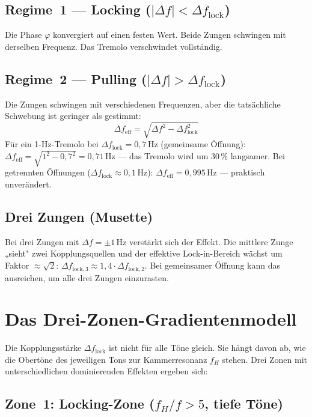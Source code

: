 \documentclass[11pt,a4paper]{article}
\begin{document}
\subsection{Regime~1 --- Locking ($|\Delta f| < \Delta f_\text{lock}$)}
Die Phase $\varphi$ konvergiert auf einen festen Wert. Beide Zungen schwingen mit derselben Frequenz. Das Tremolo verschwindet vollständig.

\subsection{Regime~2 --- Pulling ($|\Delta f| > \Delta f_\text{lock}$)}
Die Zungen schwingen mit verschiedenen Frequenzen, aber die tatsächliche Schwebung ist geringer als gestimmt:
\begin{equation}
\Delta f_\text{eff} = \sqrt{\Delta f^2 - \Delta f_\text{lock}^2}
\end{equation}
Für ein 1-Hz-Tremolo bei $\Delta f_\text{lock} = 0{,}7$\,Hz (gemeinsame Öffnung): $\Delta f_\text{eff} = \sqrt{1^2 - 0{,}7^2} = 0{,}71$\,Hz --- das Tremolo wird um 30\,\% langsamer. Bei getrennten Öffnungen ($\Delta f_\text{lock} \approx 0{,}1$\,Hz): $\Delta f_\text{eff} = 0{,}995$\,Hz --- praktisch unverändert.

\subsection{Drei Zungen (Musette)}

Bei drei Zungen mit $\Delta f = \pm 1$\,Hz verstärkt sich der Effekt. Die mittlere Zunge „sieht" zwei Kopplungsquellen und der effektive Lock-in-Bereich wächst um Faktor $\approx \sqrt{2}$: $\Delta f_{\text{lock},3} \approx 1{,}4 \cdot \Delta f_{\text{lock},2}$. Bei gemeinsamer Öffnung kann das ausreichen, um alle drei Zungen einzurasten.

\section{Das Drei-Zonen-Gradientenmodell}

Die Kopplungsstärke $\Delta f_\text{lock}$ ist nicht für alle Töne gleich. Sie hängt davon ab, wie die Obertöne des jeweiligen Tons zur Kammerresonanz $f_H$ stehen. Drei Zonen mit unterschiedlichen dominierenden Effekten ergeben sich:

\subsection{\textcolor{zone1blue}{Zone~1: Locking-Zone ($f_H/f > 5$, tiefe Töne)}}
\end{document}
